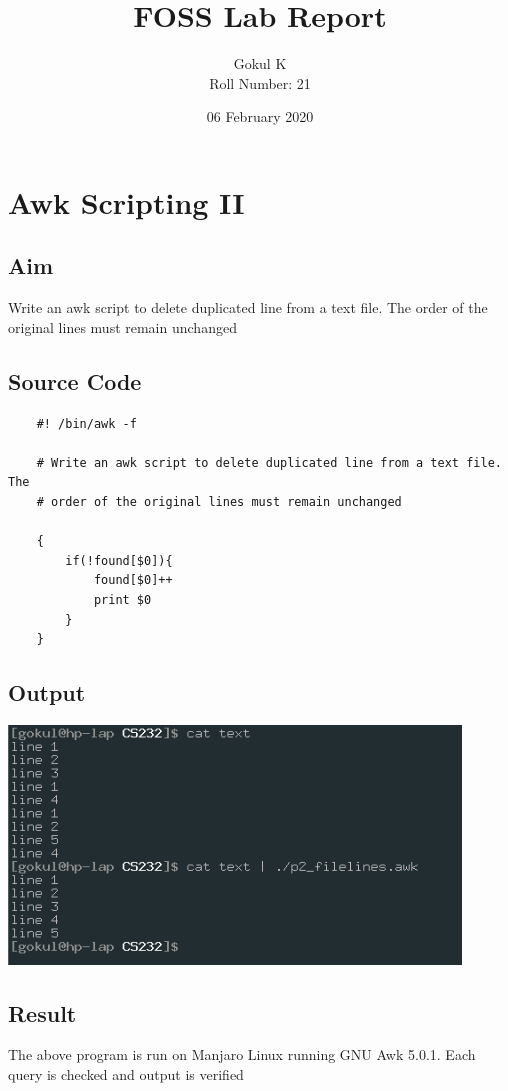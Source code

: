 \documentclass{article}
\begin{document}
\title{FOSS Lab Report}
\author{Gokul K\\[2\baselineskip]
Roll Number: 21\\[2\baselineskip]}
\date{06 February 2020}

\maketitle

\setcounter{section}{20}
\section{Awk Scripting II}
\subsection{Aim}
Write an awk script to delete duplicated line from a text file. The 
order of the original lines must remain unchanged

\subsection{Source Code}
\begin{verbatim}
    #! /bin/awk -f

    # Write an awk script to delete duplicated line from a text file. The 
    # order of the original lines must remain unchanged
    
    {
        if(!found[$0]){
            found[$0]++
            print $0
        }
    }
\end{verbatim}

\subsection{Output}
\includegraphics[width=0.9\textwidth]{img/p21.png}\newline

\subsection{Result}
The above program is run on Manjaro Linux running GNU Awk 5.0.1. 
Each query is checked and output is verified
\end{document}
